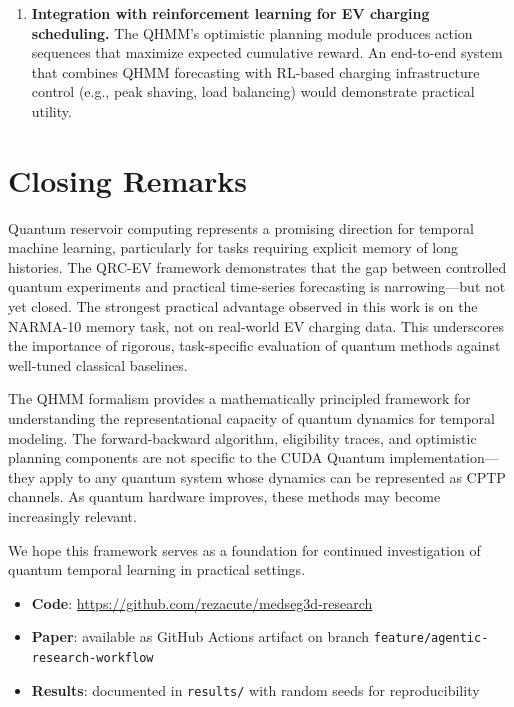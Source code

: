 \begin{enumerate}

  \item \textbf{Integration with reinforcement learning for EV charging
    scheduling.} The QHMM's optimistic planning module produces action
    sequences that maximize expected cumulative reward. An end-to-end
    system that combines QHMM forecasting with RL-based charging
    infrastructure control (e.g., peak shaving, load balancing) would
    demonstrate practical utility.

\end{enumerate}


\section{Closing Remarks}


Quantum reservoir computing represents a promising direction for temporal
machine learning, particularly for tasks requiring explicit memory of
long histories. The QRC-EV framework demonstrates that the gap between
controlled quantum experiments and practical time-series forecasting is
narrowing—but not yet closed. The strongest practical advantage observed
in this work is on the NARMA-10 memory task, not on real-world EV
charging data. This underscores the importance of rigorous, task-specific
evaluation of quantum methods against well-tuned classical baselines.


The QHMM formalism provides a mathematically principled framework for
understanding the representational capacity of quantum dynamics for
temporal modeling. The forward-backward algorithm, eligibility traces,
and optimistic planning components are not specific to the CUDA Quantum
implementation—they apply to any quantum system whose dynamics can be
represented as CPTP channels. As quantum hardware improves, these methods
may become increasingly relevant.


We hope this framework serves as a foundation for continued investigation
of quantum temporal learning in practical settings.


\begin{itemize}
  \item \textbf{Code}: \url{https://github.com/rezacute/medseg3d-research}
  \item \textbf{Paper}: available as GitHub Actions artifact on branch
    \texttt{feature/agentic-research-workflow}
  \item \textbf{Results}: documented in \texttt{results/} with
    random seeds for reproducibility
\end{itemize}
